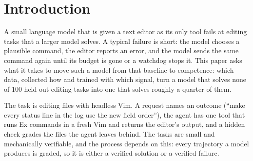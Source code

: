 \section{Introduction}
A small language model that is given a text editor as its only tool fails at editing tasks that a larger model solves.
A typical failure is short: the model chooses a plausible command, the editor reports an error, and the model sends the
same command again until its budget is gone or a watchdog stops it. This paper asks what it takes to move such a model
from that baseline to competence: which data, collected how and trained with which signal, turn a model that solves
none of 100 held-out editing tasks into one that solves roughly a quarter of them.

The task is editing files with headless Vim. A request names an outcome (``make every status line in the log use the
new field order''), the agent has one tool that runs Ex commands in a fresh Vim and returns the editor's output, and a
hidden check grades the files the agent leaves behind. The tasks are small and mechanically verifiable, and the process
depends on this: every trajectory a model produces is graded, so it is either a verified solution or a verified failure.

